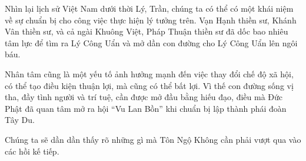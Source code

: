 Nhìn lại lịch sử Việt Nam dưới thời Lý, Trần, chúng ta có thể có một khái niệm về sự chuẩn bị cho công việc thực hiện lý tưởng trên. Vạn Hạnh thiền sư, Khánh Vân thiền sư, và cả ngài Khuông Việt, Pháp Thuận thiền sư đã dốc bao nhiêu tâm lực để tìm ra Lý Công Uẩn và mở dần con đường cho Lý Công Uẩn lên ngôi báu.

Nhân tâm cũng là một yếu tố ảnh hưởng mạnh đến việc thay đổi chế độ xã hội, có thể tạo điều kiện thuận lợi, mà cũng có thể bất lợi. Vì thế con đường sống vị tha, đầy tình người và trí tuệ, cần được mở đầu bằng hiếu đạo, điều mà Đức Phật đã quan tâm mở ra hội ``Vu Lan Bồn'' khi chuẩn bị lập thành phái đoàn Tây Du.

Chúng ta sẽ dần dần thấy rõ những gì mà Tôn Ngộ Không cần phải vượt qua vào các hồi kế tiếp.

